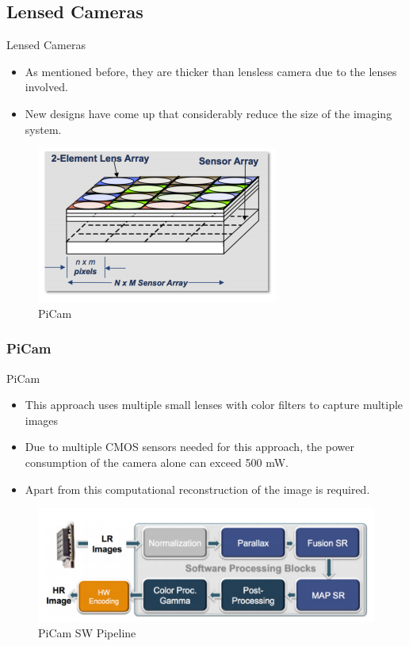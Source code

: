 \documentclass{beamer}
\begin{document}
\subsection[]{Lensed Cameras}
\begin{frame}{Lensed Cameras}
\begin{itemize}
\item As mentioned before, they are thicker than lensless camera due to the lenses involved.
\item New designs have come up that considerably reduce the size of the imaging system. 
\end{itemize}
\begin{figure}{
\includegraphics[scale=0.50]{doc_images/lensless_7.PNG}
\caption{PiCam\cite{PiCam}}}
\end{figure}

\end{frame}
\subsubsection[]{PiCam}
\begin{frame}{PiCam}
\begin{itemize}
\item This approach uses multiple small lenses with color filters to capture multiple images
\item Due to multiple CMOS sensors needed for this approach, the power consumption of the camera alone can exceed 500 mW.
\item Apart from this computational reconstruction of the image is required.
\end{itemize}
\begin{figure}
\includegraphics[scale=0.50]{doc_images/lensless_8.PNG}
\caption{PiCam SW Pipeline}
\end{figure}
\end{frame}
\end{document}
